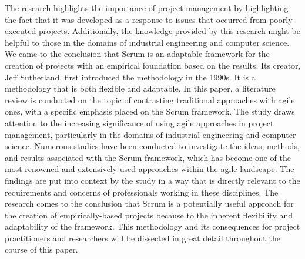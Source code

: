 \documentclass[conference]{IEEEtran}
\begin{document}
\begin{enumerate}
The research highlights the importance of project management by highlighting the fact that it was developed as a response to issues that occurred from poorly executed projects. Additionally, the knowledge provided by this research might be helpful to those in the domains of industrial engineering and computer science. We came to the conclusion that Scrum is an adaptable framework for the creation of projects with an empirical foundation based on the results. Its creator, Jeff Sutherland, first introduced the methodology in the 1990s. It is a methodology that is both flexible and adaptable.
\newline
\newline
In this paper, a literature review is conducted on the topic of contrasting traditional approaches with agile ones, with a specific emphasis placed on the Scrum framework. The study draws attention to the increasing significance of using agile approaches in project management, particularly in the domains of industrial engineering and computer science. Numerous studies have been conducted to investigate the ideas, methods, and results associated with the Scrum framework, which has become one of the most renowned and extensively used approaches within the agile landscape. The findings are put into context by the study in a way that is directly relevant to the requirements and concerns of professionals working in these disciplines. The research comes to the conclusion that Scrum is a potentially useful approach for the creation of empirically-based projects because to the inherent flexibility and adaptability of the framework. This methodology and its consequences for project practitioners and researchers will be dissected in great detail throughout the course of this paper.
\newline
\newline

\end{enumerate}
\end{document}
